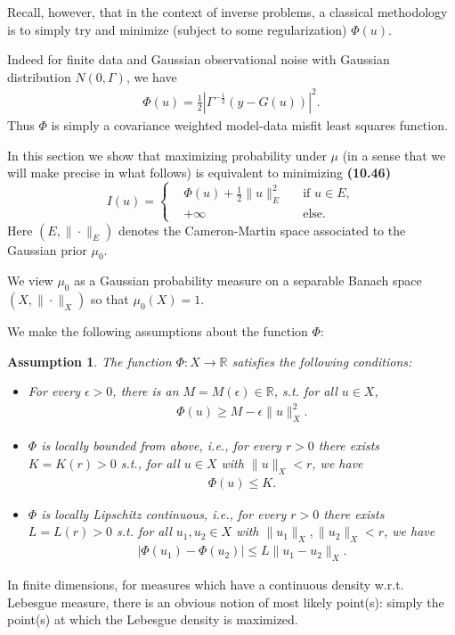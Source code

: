 \documentclass[oneside,11pt]{book}
\numberwithin{equation}{section}
\newtheorem{assumption}{Assumption}[section]
\begin{document}
Recall, however, that in the context of inverse problems, a classical methodology is to simply try and minimize (subject to some regularization) $\Phi(u)$.

Indeed for finite data and Gaussian observational noise with Gaussian distribution $N(0,\Gamma)$, we have
\begin{align*}
    \Phi(u) = \frac{1}{2}|\Gamma^{-\frac{1}{2}} ( y - G(u))|^2.
\end{align*}
Thus $\Phi$ is simply a covariance weighted model-data misfit least squares function.

%
In this section we show that maximizing probability under $\mu$ (in a sense that we will make precise in what follows) is equivalent to minimizing \textbf{(10.46)}
\begin{equation*}
    I(u) = \left\{\begin{split}
        &\Phi(u) + \frac{1}{2}\|u\|_E^2 &&\mbox{if } u\in E,\\
        &+\infty &&\mbox{else}.
    \end{split}\right.
\end{equation*}
Here $(E,\|\cdot\|_E)$ denotes the Cameron-Martin space associated to the Gaussian prior $\mu_0$.

We view $\mu_0$ as a Gaussian probability measure on a separable Banach space $(X,\|\cdot\|_X)$ so that $\mu_0(X) = 1$.

We make the following assumptions about the function $\Phi$:

\begin{assumption}
    The function $\Phi:X\to\mathbb{R}$ satisfies the following conditions:
    \begin{itemize}
        \item[(i)] For every $\epsilon > 0$, there is an $M = M(\epsilon)\in\mathbb{R}$, s.t. for all $u\in X$,
        \begin{align*}
            \Phi(u)\ge M - \epsilon\|u\|_X^2.
        \end{align*}
        \item[(ii)] $\Phi$ is locally bounded from above, i.e., for every $r > 0$ there exists $K = K(r) > 0$ s.t., for all $u\in X$ with $\|u\|_X < r$, we have
        \begin{align*}
            \Phi(u)\le K.
        \end{align*}
        \item[(iii)] $\Phi$ is locally Lipschitz continuous, i.e., for every $r > 0$ there exists $L = L(r) > 0$ s.t. for all $u_1,u_2\in X$ with $\|u_1\|_X,\|u_2\|_X < r$, we have
        \begin{align*}
            |\Phi(u_1) - \Phi(u_2)|\le L\|u_1 - u_2\|_X.
        \end{align*}
    \end{itemize}
\end{assumption}
In finite dimensions, for measures which have a continuous density w.r.t. Lebesgue measure, there is an obvious notion of most likely point(s): simply the point(s) at which the Lebesgue density is maximized.
\end{document}
